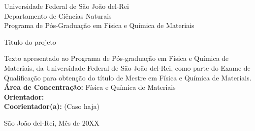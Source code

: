 \documentclass[
	12pt,				%
	english,			%
	french,				%
	spanish,			%
	brazil,				%
	english,			%
	]{article}
\numberwithin{equation}{section}
\begin{document}
\begin{center}

\vspace*{-1cm}

{\fontsize{14}{0} \selectfont Universidade Federal de São João del-Rei\\
\vspace{0.3cm}
Departamento de Ciências Naturais\\
\vspace{0.3cm}
Programa de Pós-Graduação em Física e Química de Materiais}

\vspace{6cm}


{\fontsize{16}{0} \selectfont Titulo do projeto}\\
\vspace{0.15cm}
\vspace{0.15cm}

\vspace{6cm}

\begin{flushright}
\begin{minipage}[b][4.5cm][c]{9.7cm}	%
Texto apresentado ao Programa de Pós-graduação em Física e Química de Materiais, da Universidade Federal de São João del-Rei, como parte do Exame de Qualificação para obtenção do título de Mestre em Física e Química de Materiais.\\
\textbf{Área de Concentração:} Física e Química de Materiais\\
\textbf{Orientador:} \\
\textbf{Coorientador(a):} (Caso haja)
\end{minipage}
\end{flushright}



\vfill


{\fontsize{12}{0} \selectfont São João del-Rei, Mês de 20XX}\\
\end{center}
\end{document}
